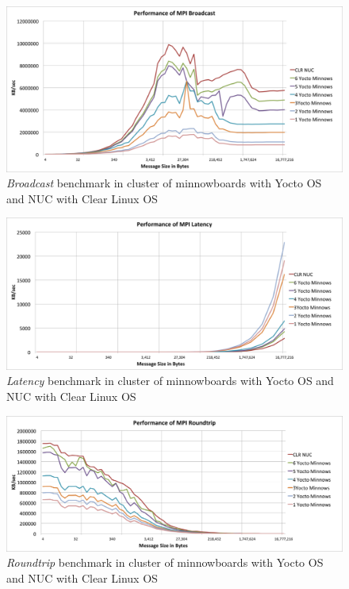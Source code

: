 \begin{figure}[H]
\centering
\includegraphics[width=1.0\textwidth]{images/mpbench_cluster_experiments/mpi_broadcast.png}
\caption{\textit{Broadcast} benchmark in cluster of minnowboards with Yocto OS and NUC
with Clear Linux OS}
\label{all_to_all_cluster}
\end{figure}

\begin{figure}[H]
\centering
\includegraphics[width=1.0\textwidth]{images/mpbench_cluster_experiments/mpi_latency.png}
\caption{\textit{Latency} benchmark in cluster of minnowboards with Yocto OS and NUC
with Clear Linux OS}
\label{all_to_all_cluster}
\end{figure}


\begin{figure}[H]
\centering
\includegraphics[width=1.0\textwidth]{images/mpbench_cluster_experiments/mpi_roundtrip.png}
\caption{\textit{Roundtrip} benchmark in cluster of minnowboards with Yocto OS and NUC
with Clear Linux OS}
\label{all_to_all_cluster}
\end{figure}


